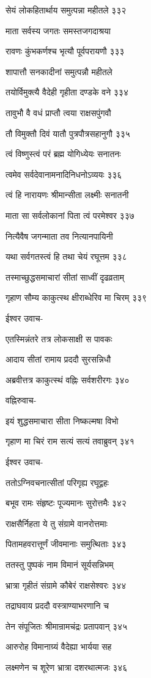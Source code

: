सेयं लोकहितार्थाय समुत्पन्ना महीतले ३३२

माता सर्वस्य जगतः समस्तजगदाश्रया

रावणः कुंभकर्णश्च भृत्यौ पूर्वपरायणौ ३३३

शापात्तौ सनकादीनां समुत्पन्नौ महीतले

तयोर्विमुक्त्यै वैदेही गृहीता दण्डके वने ३३४

तावुभौ वै वधं प्राप्तौ त्वया राक्षसपुंगवौ

तौ विमुक्तौ दिवं यातौ पुत्रपौत्रसहानुगौ ३३५

त्वं विष्णुस्त्वं परं ब्रह्म योगिध्येयः सनातनः

त्वमेव सर्वदेवानामनादिनिधनोऽव्ययः ३३६

त्वं हि नारायणः श्रीमान्सीता लक्ष्मीः सनातनी

माता सा सर्वलोकानां पिता त्वं परमेश्वर ३३७

नित्यैवैष जगन्माता तव नित्यानपायिनी

यथा सर्वगतस्त्वं हि तथा चेयं रघूत्तम ३३८

तस्माच्छुद्धसमाचारां सीतां साध्वीं दृढव्रताम्

गृहाण सौम्य काकुत्स्थ क्षीराब्धेरिव मा चिरम् ३३९

ईश्वर उवाच-

एतस्मिन्नंतरे तत्र लोकसाक्षी स पावकः

आदाय सीतां रामाय प्रददौ सुरसन्निधौ

अब्रवीत्तत्र काकुत्स्थं वह्निः सर्वशरीरगः ३४०

वह्निरुवाच-

इयं शुद्धसमाचारा सीता निष्कल्मषा विभो

गृहाण मा चिरं राम सत्यं सत्यं तवाब्रुवन् ३४१

ईश्वर उवाच-

ततोऽग्निवचनात्सीतां परिगृह्य रघूद्वहः

बभूव रामः संहृष्टः पूज्यमानः सुरोत्तमैः ३४२

राक्षसैर्निहता ये तु संग्रामे वानरोत्तमाः

पितामहवरात्तूर्णं जीवमानाः समुत्थिताः ३४३

ततस्तु पुष्पकं नाम विमानं सूर्यसन्निभम्

भ्रात्रा गृहीतं संग्रामे कौबेरं राक्षसेश्वरः ३४४

तद्राघवाय प्रददौ वस्त्राण्याभरणानि च

तेन संपूजितः श्रीमान्रामचंद्रः प्रतापवान् ३४५

आरुरोह विमानाग्र्यं वैदेह्या भार्यया सह

लक्ष्मणेन च शूरेण भ्रात्रा दशरथात्मजः ३४६

